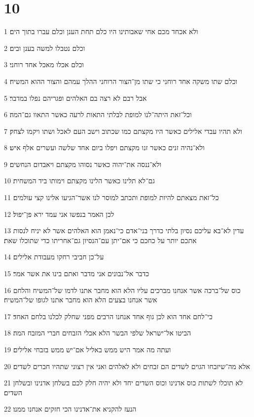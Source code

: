 \chapter{10}

\par 1 ולא אכחד מכם אחי שאבותינו היו כלם תחת הענן וכלם עברו בתוך הים׃
\par 2 וכלם נטבלו למשה בענן ובים׃
\par 3 וכלם אכלו מאכל אחד רוחני׃
\par 4 וכלם שתו משקה אחד רוחני כי שתו מן־הצור הרוחני ההלך עמהם והצור ההוא המשיח׃
\par 5 אבל רבם לא רצה בם האלהים ופגריהם נפלו במדבר׃
\par 6 וכל־זאת היתה־לנו למופת לבלתי התאות לרעה כאשר התאוו גם־המה׃
\par 7 ולא תהיו עבדי אלילים כאשר היו מקצתם כמו שכתוב וישב העם לאכל ושתו ויקמו לצחק׃
\par 8 ולא־נהיה זנים כאשר זנו מקצתם ויפלו ביום אחד שלשה ועשרים אלף איש׃
\par 9 ולא־ננסה את־יהוה כאשר נסוהו מקצתם ויאבדום הנחשים׃
\par 10 גם־לא תלינו כאשר הלינו מקצתם וימותו ביד המשחית׃
\par 11 כל־זאת מצאתם להיות למופת ותכתב למוסר לנו אשר־הגיעו אלינו קצי עולמים׃
\par 12 לכן האמר בנפשו אני עמד ירא פן־יפול׃
\par 13 עדין לא־בא עליכם נסיון בלתי כדרך בני־אדם כי־נאמן הוא האלהים אשר לא יניח לנסות אתכם יותר על כחכם כי אם־יתן עם־הנסיון גם־אחריתו כדי שתוכלו שאת׃
\par 14 על־כן חביבי רחקו מעבודת אלילים׃
\par 15 כדבר אל־נבונים אני מדבר ואתם בינו את אשר אמר׃
\par 16 כוס של־ברכה אשר אנחנו מברכים עליו הלא הוא מחבר אתנו לדמו של־המשיח והלחם אשר אנחנו בצעים הלא הוא מחבר אתנו לגופו של־המשיח׃
\par 17 כי־לחם אחד הוא לכן גוף אחד אנחנו הרבים מפני שחלק לכלנו בלחם האחד׃
\par 18 הביטו אל־ישראל שלפי הבשר הלא אכלי הזבחים חברי המזבח המה׃
\par 19 ועתה מה אמר היש ממש באליל אם־יש ממש בזבחי אלילים׃
\par 20 אלא מה־שיזבחו הגוים לשדים הם זבחים ולא לאלהים ואני אין רצוני שתהיו חברים לשדים׃
\par 21 לא תוכלו לשתות כוס אדנינו וכוס השדים יחד ולא יהיה חלק לכם בשלחן אדנינו ובשלחן השדים׃
\par 22 הנעז להקניא את־אדנינו הכי חזקים אנחנו ממנו׃
